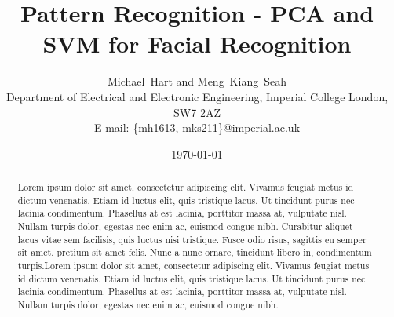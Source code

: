 \documentclass[a4paper, 10pt, conference]{ieeeconf}
\begin{document}
\title{Pattern Recognition - PCA and SVM for Facial Recognition}
\author{Michael~Hart and
        Meng~Kiang~Seah
\\
        Department of Electrical and Electronic Engineering,
        Imperial College London,
        SW7 2AZ
 \\
        E-mail: \{mh1613, mks211\}@imperial.ac.uk}
\date{\today}




\maketitle


\begin{abstract}
 Lorem ipsum dolor sit amet, consectetur adipiscing elit. Vivamus feugiat metus id dictum venenatis. Etiam id luctus elit, quis tristique lacus. Ut tincidunt purus nec lacinia condimentum. Phasellus at est lacinia, porttitor massa at, vulputate nisl. Nullam turpis dolor, egestas nec enim ac, euismod congue nibh. Curabitur aliquet lacus vitae sem facilisis, quis luctus nisi tristique. Fusce odio risus, sagittis eu semper sit amet, pretium sit amet felis. Nunc a nunc ornare, tincidunt libero in, condimentum turpis.Lorem ipsum dolor sit amet, consectetur adipiscing elit. Vivamus feugiat metus id dictum venenatis. Etiam id luctus elit, quis tristique lacus. Ut tincidunt purus nec lacinia condimentum. Phasellus at est lacinia, porttitor massa at, vulputate nisl. Nullam turpis dolor, egestas nec enim ac, euismod congue nibh.
\end{abstract}

\end{document}
